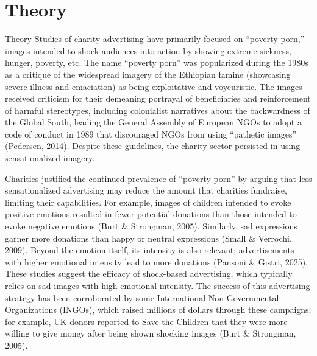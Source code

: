 \chapter{Theory}

Theory
Studies of charity advertising have primarily focused on “poverty porn,” images intended to shock audiences into action by showing extreme sickness, hunger, poverty, etc. The name “poverty porn” was popularized during the 1980s as a critique of the widespread imagery of the Ethiopian famine (showcasing severe illness and emaciation) as being exploitative and voyeuristic. The images received criticism for their demeaning portrayal of beneficiaries and reinforcement of harmful stereotypes, including colonialist narratives about the backwardness of the Global South, leading the General Assembly of European NGOs to adopt a code of conduct in 1989 that discouraged NGOs from using “pathetic images” (Pedersen, 2014). Despite these guidelines, the charity sector persisted in using sensationalized imagery. 

Charities justified the continued prevalence of “poverty porn” by arguing that less sensationalized advertising may reduce the amount that charities fundraise, limiting their capabilities. For example, images of children intended to evoke positive emotions resulted in fewer potential donations than those intended to evoke negative emotions (Burt \& Strongman, 2005). Similarly, sad expressions garner more donations than happy or neutral expressions (Small \& Verrochi, 2009). Beyond the emotion itself, its intensity is also relevant; advertisements with higher emotional intensity lead to more donations (Pansoni \& Gistri, 2025). These studies suggest the efficacy of shock-based advertising, which typically relies on sad images with high emotional intensity. The success of this advertising strategy has been corroborated by some International Non-Governmental Organizations (INGOs), which raised millions of dollars through these campaigns; for example, UK donors reported to Save the Children that they were more willing to give money after being shown shocking images (Burt \& Strongman, 2005).

